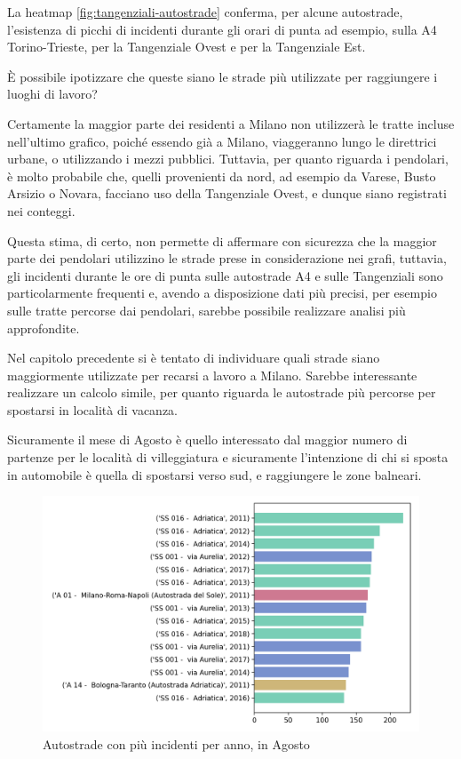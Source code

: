 \documentclass[a4paper,12pt]{report}
\begin{document}
La heatmap \ref{fig:tangenziali-autostrade} conferma, per alcune autostrade, 
l'esistenza di picchi di incidenti durante gli orari di punta ad esempio, 
sulla A4 Torino-Trieste, 
per la Tangenziale Ovest e per la Tangenziale Est. 

\`E possibile ipotizzare che queste siano le strade più utilizzate per 
raggiungere i luoghi di lavoro? 

Certamente la maggior parte dei residenti a Milano non utilizzerà le tratte incluse 
nell'ultimo grafico, poiché essendo già a Milano, 
viaggeranno lungo le direttrici urbane, o utilizzando i mezzi pubblici. 
Tuttavia, per quanto riguarda i pendolari, è molto probabile che, quelli provenienti 
da nord, ad esempio da Varese, Busto Arsizio o Novara, 
facciano uso della Tangenziale Ovest, 
e dunque siano registrati nei conteggi. 

Questa stima, di certo, non permette di affermare con sicurezza 
che la maggior parte dei pendolari utilizzino le strade prese in considerazione 
nei grafi, 
tuttavia, gli incidenti durante le ore di punta sulle autostrade A4 e sulle 
Tangenziali sono particolarmente frequenti e, avendo a disposizione dati più 
precisi, per esempio sulle tratte percorse dai pendolari, sarebbe possibile 
realizzare analisi più approfondite. 



Nel capitolo precedente si è tentato di individuare quali strade siano maggiormente 
utilizzate per recarsi a lavoro a Milano. 
Sarebbe interessante realizzare un calcolo simile, per quanto riguarda le autostrade 
più percorse per spostarsi in località di vacanza. 

Sicuramente il mese di Agosto è quello interessato dal maggior numero 
di partenze per le località di villeggiatura e sicuramente l'intenzione 
di chi si sposta in automobile è quella di spostarsi verso sud, 
e raggiungere le zone balneari. 

\begin{figure}
    \includegraphics[width=\linewidth]{../src/incidenti/incidenti_aci/agosto/autostrade_anno_agosto.png}
    \caption{Autostrade con più incidenti per anno, in Agosto}
    \label{fig:autostrade-anno-agosto}
\end{figure}
\end{document}
